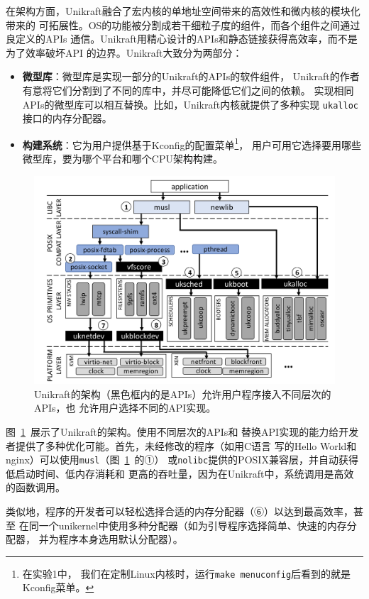 \documentclass[UTF8,fontset=none,linespread=1.15]{ctexart}
\begin{document}
在架构方面，Unikraft融合了宏内核的单地址空间带来的高效性和微内核的模块化带来的
可拓展性。OS的功能被分割成若干细粒子度的组件，而各个组件之间通过良定义的APIs
通信。Unikraft用精心设计的APIs和静态链接获得高效率，而不是为了效率破坏API
的边界。Unikraft大致分为两部分：
\begin{itemize}
\item \textbf{微型库}：微型库是实现一部分的Unikraft的APIs的软件组件，
Unikraft的作者有意将它们分割到了不同的库中，并尽可能降低它们之间的依赖。
实现相同APIs的微型库可以相互替换。比如，Unikraft内核就提供了多种实现
\texttt{ukalloc}接口的内存分配器。
\item \textbf{构建系统}：它为用户提供基于Kconfig的配置菜单\footnote{在实验1中，
我们在定制Linux内核时，运行\texttt{make menuconfig}后看到的就是Kconfig菜单。}，
用户可用它选择要用哪些微型库，要为哪个平台和哪个CPU架构构建。
\end{itemize}
\begin{figure}[!hbt]
\includegraphics[width=\linewidth]{pictures/Unikraft-architecture.png}
\caption{Unikraft的架构（黑色框内的是APIs）允许用户程序接入不同层次的APIs，也
允许用户选择不同的API实现。}\label{fig:unikraft-arch}
\end{figure}

图\ \ref{fig:unikraft-arch}\ 展示了Unikraft的架构。使用不同层次的APIs和
替换API实现的能力给开发者提供了多种优化可能。首先，未经修改的程序（如用C语言
写的Hello World和nginx）可以使用\texttt{musl}（图\ \ref{fig:unikraft-arch}\ 的①）
或\texttt{nolibc}提供的POSIX兼容层，并自动获得低启动时间、低内存消耗和
更高的吞吐量，因为在Unikraft中，系统调用是高效的函数调用。

类似地，程序的开发者可以轻松选择合适的内存分配器（⑥）以达到最高效率，甚至
在同一个unikernel中使用多种分配器（如为引导程序选择简单、快速的内存分配器，
并为程序本身选用默认分配器）。
\end{document}
